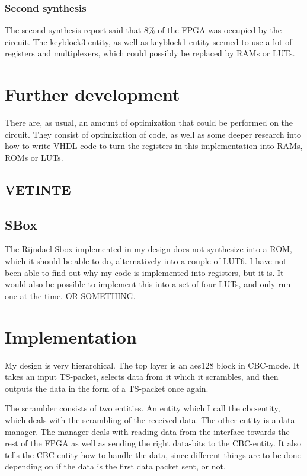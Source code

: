 \subsubsection{Second synthesis}
The second synthesis report said that 8\% of the FPGA was occupied by 
the circuit. The keyblock3 entity, as well as keyblock1 entity seemed 
to use a lot of registers and multiplexers, which could possibly be 
replaced by RAMs or LUTs.

\section{Further development}
There are, as usual, an amount of optimization that could be performed 
on the circuit. They consist of optimization of code, as well as some 
deeper research into how to write VHDL code to turn the registers in 
this implementation into RAMs, ROMs or LUTs.

\subsection{VETINTE}

\subsection{SBox}
The Rijndael Sbox implemented in my design does not synthesize into a 
ROM, which it should be able to do, alternatively into a couple of LUT6.
I have not been able to find out why my code is implemented into 
registers, but it is. 
It would also be possible to implement this into a set of four LUTs, 
and only run one at the time. OR SOMETHING.

\section{Implementation}
My design is very hierarchical. The top layer is an aes128 block in 
CBC-mode. It takes an input TS-packet, selects data from it which it 
scrambles, and then outputs the data in the form of a TS-packet once 
again.

The scrambler consists of two entities. An entity which I call the 
cbc-entity, which deals with the scrambling of the received data. The 
other entity is a data-manager. The manager deals with reading data 
from the interface towards the rest of the FPGA as well as sending the 
right data-bits to the CBC-entity. It also tells the CBC-entity how to 
handle the data, since different things are to be done depending on if 
the data is the first data packet sent, or not.

